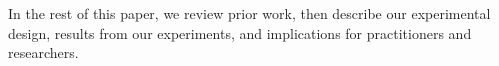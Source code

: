 


In the rest of this paper, we review prior work, then describe our experimental design, results from our experiments, and implications for practitioners and researchers.